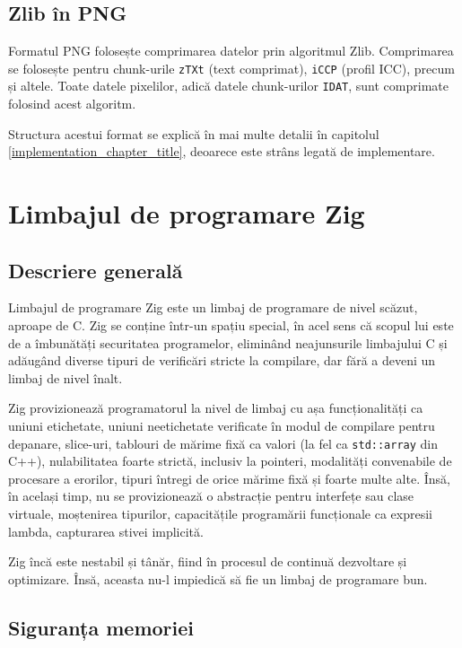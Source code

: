 \documentclass[a4paper,12pt]{report}
\begin{document}
\subsection{Zlib în \acs{PNG}}

Formatul \ac{PNG} folosește comprimarea datelor prin algoritmul Zlib.
Comprimarea se folosește pentru chunk-urile \texttt{zTXt} (text comprimat),
\texttt{iCCP} (profil \ac{ICC}), precum și altele.
Toate datele pixelilor, adică datele chunk-urilor \texttt{IDAT}, sunt comprimate folosind acest algoritm.

Structura acestui format se explică în mai multe detalii în capitolul \ref{implementation_chapter_title},
deoarece este strâns legată de implementare.

\section{Limbajul de programare Zig}

\subsection{Descriere generală}

Limbajul de programare Zig\cite{zig} este un limbaj de programare de nivel scăzut, aproape de C.
Zig se conține într-un spațiu special, în acel sens că scopul lui este de
a îmbunătăți securitatea programelor, eliminând neajunsurile limbajului C
și adăugând diverse tipuri de verificări stricte la compilare,
dar fără a deveni un limbaj de nivel înalt.

Zig provizionează programatorul la nivel de limbaj cu așa funcționalități ca 
uniuni etichetate, uniuni neetichetate verificate în modul de compilare pentru depanare,
slice-uri, tablouri de mărime fixă ca valori (la fel ca \texttt{std::array} din C++),
nulabilitatea foarte strictă, inclusiv la pointeri, modalități convenabile de procesare a erorilor,
tipuri întregi de orice mărime fixă și foarte multe alte.
Însă, în același timp, nu se provizionează o abstracție pentru interfețe sau clase virtuale,
moștenirea tipurilor, capacitățile programării funcționale ca expresii lambda,
capturarea stivei implicită.

Zig încă este nestabil și tânăr, fiind în procesul de continuă dezvoltare și optimizare.
Însă, aceasta nu-l impiedică să fie un limbaj de programare bun.

\subsection{Siguranța memoriei}
\end{document}
